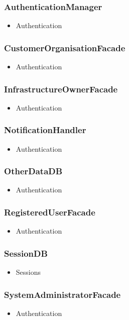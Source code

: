     \subsubsection{AuthenticationManager}
        \begin{itemize}
            \item Authentication
        \end{itemize}

    \subsubsection{CustomerOrganisationFacade}
        \begin{itemize}
            \item Authentication
        \end{itemize}

    \subsubsection{InfrastructureOwnerFacade}
        \begin{itemize}
            \item Authentication
        \end{itemize}

    \subsubsection{NotificationHandler}
        \begin{itemize}
            \item Authentication
        \end{itemize}

    \subsubsection{OtherDataDB}
        \begin{itemize}
            \item Authentication
        \end{itemize}

    \subsubsection{RegisteredUserFacade}
        \begin{itemize}
            \item Authentication
        \end{itemize}

    \subsubsection{SessionDB}
        \begin{itemize}
            \item Sessions
        \end{itemize}

    \subsubsection{SystemAdministratorFacade}
        \begin{itemize}
            \item Authentication
        \end{itemize}
